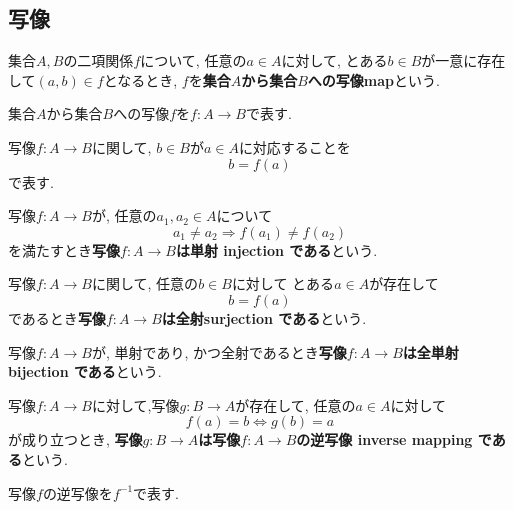 \subsection{写像}
\begin{Def}
集合$A,B$の二項関係$f$について,
任意の$a\in A$に対して, とある$b\in B$が一意に存在して$(a,b)\in f$となるとき,
$f$を{\bf 集合$A$から集合$B$への写像map}という.
\end{Def}
\begin{Notation}
集合$A$から集合$B$への写像$f$を$f:A\rightarrow B$で表す.
\end{Notation}
\begin{comment}
\begin{caution}
以下では, 「{\bf 関数 function\index{かんすう@関数}}」と「写像」を同じ意味で用いる.
\end{caution}
\end{comment}
\begin{Notation}
写像$f:A\rightarrow B$に関して, $b\in B$が$a\in A$に対応することを
\[
b=f(a)
\]
で表す.
\end{Notation}
\begin{Def}
写像$f:A\rightarrow B$が,
任意の$a_1,a_2\in A$について
\[
a_1\neq a_2\Rightarrow f(a_1)\neq f(a_2)
\]
を満たすとき{\bf 写像$f:A\rightarrow B$は単射 injection である}という.
\end{Def}
\begin{Def}
写像$f:A\rightarrow B$に関して,
任意の$b\in B$に対して
とある$a\in A$が存在して
\[
b=f(a)
\]
であるとき{\bf 写像$f:A\rightarrow B$は全射surjection である}という.
\end{Def}
\begin{Def}
写像$f:A\rightarrow B$が, 単射であり, かつ全射であるとき{\bf 写像$f:A\rightarrow B$は全単射 bijection である}という.
\end{Def}

\begin{Def}
写像$f:A\rightarrow B$に対して,写像$g:B\rightarrow A$が存在して, 任意の$a\in A$に対して
\[
f(a)=b \Leftrightarrow g(b)=a
\]
が成り立つとき, {\bf 写像$g:B\rightarrow A$は写像$f:A\rightarrow B$の逆写像 inverse mapping である}という.
\end{Def}
\begin{Notation}
写像$f$の逆写像を$f^{-1}$で表す.
\end{Notation}

